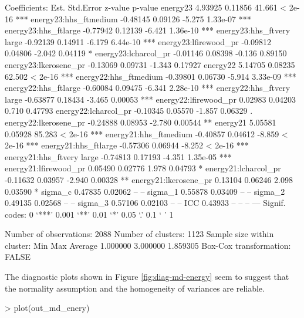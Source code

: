 {\begin{example}
Coefficients:
                              Est. Std.Error z-value  p-value    
energy23                   4.93925   0.11856  41.661  < 2e-16 ***
energy23:hhs_ftmedium     -0.48145   0.09126  -5.275 1.33e-07 ***
energy23:hhs_ftlarge      -0.77942   0.12139  -6.421 1.36e-10 ***
energy23:hhs_ftvery large -0.92139   0.14911  -6.179 6.44e-10 ***
energy23:lfirewood_pr     -0.09812   0.04806  -2.042  0.04119 *  
energy23:lcharcol_pr      -0.01146   0.08398  -0.136  0.89150    
energy23:lkerosene_pr     -0.13069   0.09731  -1.343  0.17927    
energy22                   5.14705   0.08235  62.502  < 2e-16 ***
energy22:hhs_ftmedium     -0.39801   0.06730  -5.914 3.33e-09 ***
energy22:hhs_ftlarge      -0.60084   0.09475  -6.341 2.28e-10 ***
energy22:hhs_ftvery large -0.63877   0.18434  -3.465  0.00053 ***
energy22:lfirewood_pr      0.02983   0.04203   0.710  0.47793    
energy22:lcharcol_pr      -0.10345   0.05570  -1.857  0.06329 .  
energy22:lkerosene_pr     -0.24888   0.08953  -2.780  0.00544 ** 
energy21                   5.05581   0.05928  85.283  < 2e-16 ***
energy21:hhs_ftmedium     -0.40857   0.04612  -8.859  < 2e-16 ***
energy21:hhs_ftlarge      -0.57306   0.06944  -8.252  < 2e-16 ***
energy21:hhs_ftvery large -0.74813   0.17193  -4.351 1.35e-05 ***
energy21:lfirewood_pr      0.05490   0.02776   1.978  0.04793 *  
energy21:lcharcol_pr      -0.11632   0.03957  -2.940  0.00328 ** 
energy21:lkerosene_pr      0.13104   0.06246   2.098  0.03590 *  
sigma_c                    0.47835   0.02062      --       --    
sigma_1                    0.55878   0.03409      --       --    
sigma_2                    0.49135   0.02568      --       --    
sigma_3                    0.57106   0.02103      --       --    
ICC                        0.43933        --      --       --    
---
Signif. codes:  0 ‘***’ 0.001 ‘**’ 0.01 ‘*’ 0.05 ‘.’ 0.1 ‘ ’ 1

Number of observations: 2088 
Number of clusters: 1123 
Sample size within cluster:
     Min      Max  Average 
1.000000 3.000000 1.859305 
Box-Cox transformation: FALSE
\end{example}
The diagnostic plots shown in Figure \ref{fig:diag-md-energy} seem to suggest that the normality assumption and the homogeneity of variances are reliable.
\begin{example}
> plot(out_md_enery)
\end{example}

}

